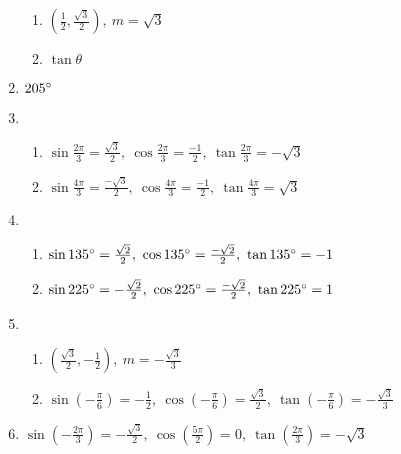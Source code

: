 \documentclass{article}
\begin{document}
\begin{enumerate}
\begin{enumerate}
	\item $\left( \frac{1}{2}, \frac{\sqrt{3}}{2} \right), \ m = \sqrt{3}$
	
	\item $\tan{\theta}$
	
	\end{enumerate}
	
\item $205 \degree$

\item 

	\begin{enumerate}
	
	\item $\sin{\frac{2 \pi}{3}} = \frac{\sqrt{3}}{2}, \ \cos{\frac{2 \pi}{3}} = \frac{-1}{2}, \ \tan{\frac{2 \pi}{3}} = -\sqrt{3}$
	
	\item $\sin{\frac{4 \pi}{3}} = \frac{-\sqrt{3}}{2}, \ \cos{\frac{4 \pi}{3}} = \frac{-1}{2}, \ \tan{\frac{4 \pi}{3}} = \sqrt{3}$
	
	\end{enumerate}
	
\item
	
	\begin{enumerate}
	
	\item $\sin{135 \degree} = \frac{\sqrt{2}}{2}, \ \cos{135 \degree} = \frac{-\sqrt{2}}{2}, \ \tan{135 \degree} = -1$
	
	\item $\sin{225 \degree} = -\frac{\sqrt{2}}{2}, \ \cos{225 \degree} = \frac{-\sqrt{2}}{2}, \ \tan{225 \degree} = 1$
	
	\end{enumerate}
	
\item

	\begin{enumerate}
	
	\item $\left(\frac{\sqrt{3}}{2}, -\frac{1}{2} \right), \ m = -\frac{\sqrt{3}}{3}$
	
	\item $\sin{\left( -\frac{\pi}{6} \right)} = -\frac{1}{2}, \ \cos{\left( -\frac{\pi}{6} \right)} = \frac{\sqrt{3}}{2}, \ \tan{\left( -\frac{\pi}{6} \right)} = -\frac{\sqrt{3}}{3}$
	
	\end{enumerate}
	
\item $\sin{\left( -\frac{2\pi}{3} \right)} = -\frac{\sqrt{3}}{2}, \ \cos{\left( \frac{5 \pi}{2} \right)} = 0, \ \tan{ \left( \frac{2 \pi}{3} \right)} = -\sqrt{3}$


\end{enumerate}
\end{document}
